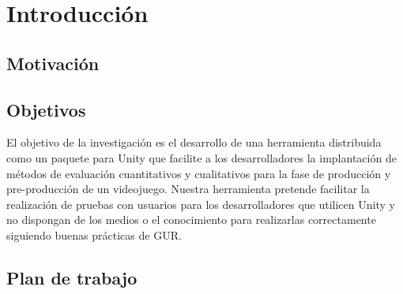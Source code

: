 \chapter{Introducción}
\label{cap:introduccion}


\section{Motivación}


\section{Objetivos}
El objetivo de la investigación es el desarrollo de una herramienta distribuida como un paquete para Unity que facilite a los desarrolladores la implantación de métodos de evaluación cuantitativos y cualitativos para la fase de producción y pre-producción de un videojuego. Nuestra herramienta pretende facilitar la realización de pruebas con usuarios para los desarrolladores que utilicen Unity y no dispongan de los medios o el conocimiento para realizarlas correctamente siguiendo buenas prácticas de GUR.

\section{Plan de trabajo}







